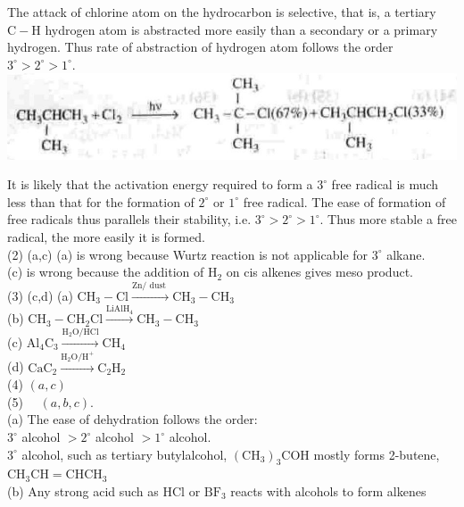 \documentclass[10pt]{article}
\begin{document}
The attack of chlorine atom on the hydrocarbon is selective, that is, a tertiary $\mathrm{C}-\mathrm{H}$ hydrogen atom is abstracted more easily than a secondary or a primary hydrogen. Thus rate of abstraction of hydrogen atom follows the order\\
$3^{\circ}>2^{\circ}>1^{\circ}$.\\
\includegraphics[max width=\textwidth, center]{2025_01_28_8470952b98110cec3aabg-245}

It is likely that the activation energy required to form a $3^{\circ}$ free radical is much less than that for the formation of $2^{\circ}$ or $1^{\circ}$ free radical. The ease of formation of free radicals thus parallels their stability, i.e. $3^{\circ}>2^{\circ}>1^{\circ}$. Thus more stable a free radical, the more easily it is formed.\\
(2) (a,c) (a) is wrong because Wurtz reaction is not applicable for $3^{\circ}$ alkane.\\
(c) is wrong because the addition of $\mathrm{H}_{2}$ on cis alkenes gives meso product.\\
(3) (c,d) (a) $\mathrm{CH}_{3}-\mathrm{Cl} \xrightarrow{\mathrm{Zn} / \text { dust }} \mathrm{CH}_{3}-\mathrm{CH}_{3}$\\
(b) $\mathrm{CH}_{3}-\mathrm{CH}_{2} \mathrm{Cl} \xrightarrow{\mathrm{LiAlH}_{4}} \mathrm{CH}_{3}-\mathrm{CH}_{3}$\\
(c) $\mathrm{Al}_{4} \mathrm{C}_{3} \xrightarrow{\mathrm{H}_{2} \mathrm{O} / \mathrm{HCl}} \mathrm{CH}_{4}$\\
(d) $\mathrm{CaC}_{2} \xrightarrow{\mathrm{H}_{2} \mathrm{O} / \mathrm{H}^{+}} \mathrm{C}_{2} \mathrm{H}_{2}$\\
(4) $(a, c)$\\
(5) $\quad(a, b, c)$.\\
(a) The ease of dehydration follows the order:\\
$3^{\circ}$ alcohol $>2^{\circ}$ alcohol $>1^{\circ}$ alcohol.\\
$3^{\circ}$ alcohol, such as tertiary butylalcohol, $\left(\mathrm{CH}_{3}\right)_{3} \mathrm{COH}$ mostly forms 2-butene, $\mathrm{CH}_{3} \mathrm{CH}=\mathrm{CHCH}_{3}$\\
(b) Any strong acid such as HCl or $\mathrm{BF}_{3}$ reacts with alcohols to form alkenes\\
\end{document}
